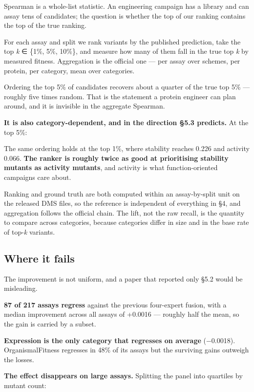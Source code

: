 \documentclass{article}
\begin{document}
Spearman is a whole-list statistic. An engineering campaign has a library and can assay tens of
candidates; the question is whether the top of our ranking contains the top of the true ranking.

For each assay and split we rank variants by the published prediction, take the top \emph{k} ∈ \{1\%, 5\%, 10\%\},
and measure how many of them fall in the true top \emph{k} by measured fitness. Aggregation is the official
one --- per assay over schemes, per protein, per category, mean over categories.



Ordering the top 5\% of candidates recovers about a quarter of the true top 5\% --- roughly five times
random. That is the statement a protein engineer can plan around, and it is invisible in the aggregate
Spearman.

\textbf{It is also category-dependent, and in the direction §5.3 predicts.} At the top 5\%:



The same ordering holds at the top 1\%, where stability reaches 0.226 and activity 0.066. \textbf{The ranker is
roughly twice as good at prioritising stability mutants as activity mutants}, and activity is what
function-oriented campaigns care about.

Ranking and ground truth are both computed within an assay-by-split unit on the released DMS files, so
the reference is independent of everything in §4, and aggregation follows the official chain. The lift,
not the raw recall, is the quantity to compare across categories, because categories differ in size and
in the base rate of top-\emph{k} variants.

\subsection{Where it fails}\label{where-it-fails}

The improvement is not uniform, and a paper that reported only §5.2 would be misleading.

\textbf{87 of 217 assays regress} against the previous four-expert fusion, with a median improvement across
all assays of +0.0016 --- roughly half the mean, so the gain is carried by a subset.

\textbf{Expression is the only category that regresses on average} (−0.0018). OrganismalFitness regresses in
48\% of its assays but the surviving gains outweigh the losses.

\textbf{The effect disappears on large assays.} Splitting the panel into quartiles by mutant count:
\end{document}
